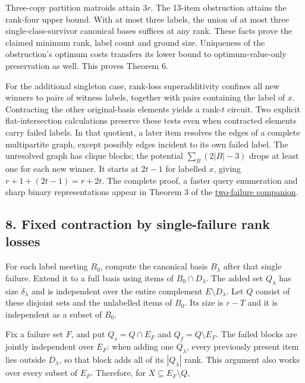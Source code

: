 Three-copy partition matroids attain \(3r\). The 13-item obstruction attains the rank-four upper bound. With at most three labels, the union of at most three single-class-survivor canonical bases suffices at any rank. These facts prove the claimed minimum rank, label count and ground size. Uniqueness of the obstruction's optimum costs transfers its lower bound to optimum-value-only preservation as well. This proves Theorem 6.

For the additional singleton case, rank-loss superadditivity confines all new winners to pairs of witness labels, together with pairs containing the label of \(x\). Contracting the other original-basis elements yields a rank-\(t\) circuit. Two explicit flat-intersection calculations preserve these tests even when contracted elements carry failed labels. In that quotient, a later item resolves the edges of a complete multipartite graph, except possibly edges incident to its own failed label. The unresolved graph has clique blocks; the potential \(\sum_B(2|B|-3)\) drops at least one for each new winner. It starts at \(2t-1\) for labelled \(x\), giving \(r+1+(2t-1)=r+2t\). The complete proof, a faster query enumeration and sharp binary representations appear in Theorem 3 of the \href{https://github.com/icekylinx/algorithm-frontier/blob/main/problems/matroid-failure-summaries/manuscripts/two-failure-oracle-prefix-bounds.md}{two-failure companion}.

\hypertarget{af-240b5086c5-fixed-contraction-by-single-failure-rank-losses}{%
\subsection{8. Fixed contraction by single-failure rank losses}\label{af-240b5086c5-fixed-contraction-by-single-failure-rank-losses}}

For each label meeting \(B_0\), compute the canonical basis \(B_\lambda\) after that single failure. Extend it to a full basis using items of \(B_0\cap D_\lambda\). The added set \(Q_\lambda\) has size \(\delta_\lambda\) and is independent over the entire complement \(E\setminus D_\lambda\). Let \(Q\) consist of these disjoint sets and the unlabelled items of \(B_0\). Its size is \(r-T\) and it is independent as a subset of \(B_0\).

Fix a failure set \(F\), and put \(Q_s=Q\cap E_F\) and \(Q_f=Q\setminus E_F\). The failed blocks are jointly independent over \(E_F\): when adding one \(Q_\lambda\), every previously present item lies outside \(D_\lambda\), so that block adds all of its \(|Q_\lambda|\) rank. This argument also works over every subset of \(E_F\). Therefore, for \(X\subseteq E_F\setminus Q\),

